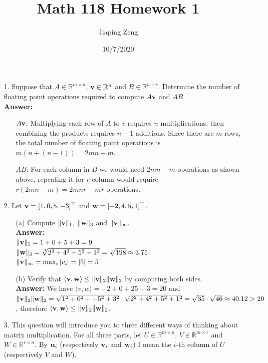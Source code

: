\documentclass{article}
\title{Math 118 Homework 1}
\date{10/7/2020}
\author{Jiaping Zeng}
\newcommand{\bu}{{\bf u}}
\newcommand{\bv}{{\bf v}}
\newcommand{\bw}{{\bf w}}
\begin{document}
\maketitle

\begin{itemize}
      \item [1.] Suppose that $A\in\mathbb{R}^{m\times n}$, $\bv\in\mathbb{R}^{n}$ and $B\in\mathbb{R}^{n\times r}$. Determine the number of floating point operations required to compute $A\bv$ and $AB$.\\
            \textbf{Answer: } \begin{itemize}
                  \item [$A\bv$:] Multiplying each row of $A$ to $v$ requires $n$ multiplications, then combining the products requires $n-1$ additions. Since there are $m$ rows, the total number of floating point operations is $m(n+(n-1))=2mn-m$.
                  \item [$AB$:] For each column in $B$ we would need $2mn-m$ operations as shown above, repeating it for $r$ column would require $r(2mn-m)=2mnr-mr$ operations.
            \end{itemize}
      \item [2.] Let $\bv = [1,0,5,-3]^{\top}$ and $\bw = [-2,4,5,1]^{\top}$.
            \begin{itemize}
                  \item [(a)] Compute $\|\bv\|_1$, $\|\bw\|_{3}$ and $\|\bv\|_{\infty}$.\\
                        \textbf{Answer: }\\
                        $\|\bv\|_1=1+0+5+3=9$\\
                        $\|\bw\|_{3}=\sqrt[3]{2^3+4^3+5^3+1^3}=\sqrt[3]{198}\approx 3.75$\\
                        $\|\bv\|_{\infty}=\max_i\abs{v_i}=\abs{5}=5$
                  \item [(b)] Verify that $\langle\bv,\bw\rangle \leq \|\bv\|_2\|\bw\|_2$ by computing both sides.\\
                        \textbf{Answer: } We have $\langle v,w\rangle=-2+0+25-3=20$ and $\|\bv\|_2\|\bw\|_2=\sqrt{1^2+0^2++5^2+3^2}\cdot\sqrt{2^2+4^2+5^2+1^2}=\sqrt{35}\cdot\sqrt{46}\approx 40.12>20$, therefore $\langle\bv,\bw\rangle \leq \|\bv\|_2\|\bw\|_2$.
            \end{itemize}
      \item [3.] This question will introduce you to three different ways of thinking about matrix multiplication. For all three parts, let $U\in\mathbb{R}^{m\times n}$, $V\in\mathbb{R}^{m\times r}$ and $W\in\mathbb{R}^{r\times n}$. By $\bu_i$ (respectively $\bv_i$ and $\bw_i$) I mean the $i$-th column of $U$ (respectively $V$ and $W$).

\end{itemize}
\end{document}
